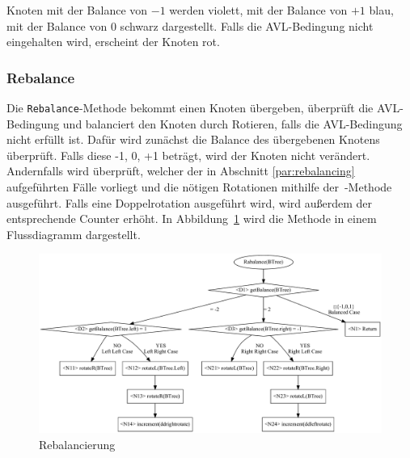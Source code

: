 Knoten mit der Balance von \(-1\) werden violett, mit der Balance von \(+1\)
blau, mit der Balance von \(0\) schwarz dargestellt.
Falls die AVL-Bedingung nicht eingehalten wird, erscheint der Knoten rot.

\subsubsection{Rebalance}\label{par:MethodRebalance}
Die \verb|Rebalance|-Methode bekommt einen Knoten übergeben, überprüft die AVL-Bedingung und
balanciert den Knoten durch Rotieren, falls die AVL-Bedingung nicht erfüllt ist.
Dafür wird zunächst die Balance des übergebenen Knotens überprüft.
Falls diese -1, 0, +1 beträgt, wird der Knoten nicht verändert.
Andernfalls wird überprüft, welcher der in Abschnitt \ref{par:rebalancing} aufgeführten Fälle
vorliegt und die nötigen Rotationen mithilfe der~-Methode ausgeführt.
Falls eine Doppelrotation ausgeführt wird, wird außerdem der entsprechende Counter erhöht.
In Abbildung~\ref{fig:rebalance} wird die Methode in einem Flussdiagramm dargestellt.
\begin{figure}[hbtp]
    \centering
    \includegraphics[scale = 0.35]{img/gv/rebalance}
    \caption{Rebalancierung}
    \label{fig:rebalance}
\end{figure}

